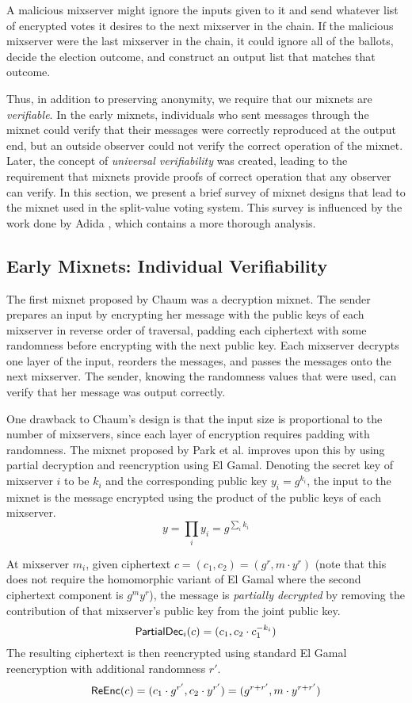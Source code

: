 A malicious mixserver might ignore the inputs given to it and send whatever list of encrypted votes it desires to the next mixserver in the chain. If the malicious mixserver were the last mixserver in the chain, it could ignore all of the ballots, decide the election outcome, and construct an output list that matches that outcome.

Thus, in addition to preserving anonymity, we require that our mixnets are \emph{verifiable}. In the early mixnets, individuals who sent messages through the mixnet could verify that their messages were correctly reproduced at the output end, but an outside observer could not verify the correct operation of the mixnet. Later, the concept of \emph{universal verifiability} was created, leading to the requirement that mixnets provide proofs of correct operation that any observer can verify. In this section, we present a brief survey of mixnet designs that lead to the mixnet used in the split-value voting system. This survey is influenced by the work done by Adida \cite{adida-phd}, which contains a more thorough analysis.

\subsection{Early Mixnets: Individual Verifiability}

The first mixnet proposed by Chaum \cite{chaum81} was a decryption mixnet. The sender prepares an input by encrypting her message with the public keys of each mixserver in reverse order of traversal, padding each ciphertext with some randomness before encrypting with the next public key. Each mixserver decrypts one layer of the input, reorders the messages, and passes the messages onto the next mixserver. The sender, knowing the randomness values that were used, can verify that her message was output correctly.

One drawback to Chaum's design is that the input size is proportional to the number of mixservers, since each layer of encryption requires padding with randomness. The mixnet proposed by Park et al. \cite{park94} improves upon this by using partial decryption and reencryption using El Gamal. Denoting the secret key of mixserver $i$ to be $k_i$ and the corresponding public key $y_i = g^{k_i}$, the input to the mixnet is the message encrypted using the product of the public keys of each mixserver.
$$
y = \prod_{i}{y_i} = g^{\sum_{i}{k_i}}
$$

At mixserver $m_i$, given ciphertext $c = (c_1, c_2) = (g^r, m \cdot y^r)$ (note that this does not require the homomorphic variant of El Gamal where the second ciphertext component is $g^m y^r$), the message is \emph{partially decrypted} by removing the contribution of that mixserver's public key from the joint public key.
$$
\operatorname{\mathsf{PartialDec}}_{i}(c) = (c_1, c_2 \cdot c_{1}^{-k_i})
$$
The resulting ciphertext is then reencrypted using standard El Gamal reencryption with additional randomness $r'$.
$$
\operatorname{\mathsf{ReEnc}}(c) = (c_1 \cdot g^{r'}, c_2 \cdot y^{r'}) = (g^{r+r'}, m \cdot y^{r+r'})
$$

